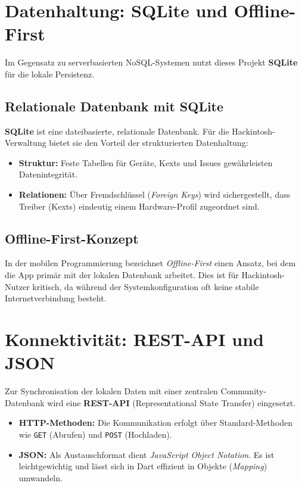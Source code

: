 \section{Datenhaltung: SQLite und Offline-First}
Im Gegensatz zu serverbasierten NoSQL-Systemen nutzt dieses Projekt \textbf{SQLite} für die lokale Persistenz.

\subsection{Relationale Datenbank mit SQLite}
\textbf{SQLite} ist eine dateibasierte, relationale Datenbank. Für die Hackintosh-Verwaltung bietet sie den Vorteil der strukturierten Datenhaltung:
\begin{itemize}
    \item \textbf{Struktur:} Feste Tabellen für Geräte, Kexts und Issues gewährleisten Datenintegrität.
    \item \textbf{Relationen:} Über Fremdschlüssel (\textit{Foreign Keys}) wird sichergestellt, dass Treiber (Kexts) eindeutig einem Hardware-Profil zugeordnet sind.
\end{itemize}

\subsection{Offline-First-Konzept}
In der mobilen Programmierung bezeichnet \textit{Offline-First} einen Ansatz, bei dem die App primär mit der lokalen Datenbank arbeitet. Dies ist für Hackintosh-Nutzer kritisch, da während der Systemkonfiguration oft keine stabile Internetverbindung besteht.

\section{Konnektivität: REST-API und JSON}
Zur Synchronisation der lokalen Daten mit einer zentralen Community-Datenbank wird eine \textbf{REST-API} (Representational State Transfer) eingesetzt.
\begin{itemize}
    \item \textbf{HTTP-Methoden:} Die Kommunikation erfolgt über Standard-Methoden wie \texttt{GET} (Abrufen) und \texttt{POST} (Hochladen).
    \item \textbf{JSON:} Als Austauschformat dient \textit{JavaScript Object Notation}. Es ist leichtgewichtig und lässt sich in Dart effizient in Objekte (\textit{Mapping}) umwandeln.
\end{itemize}

